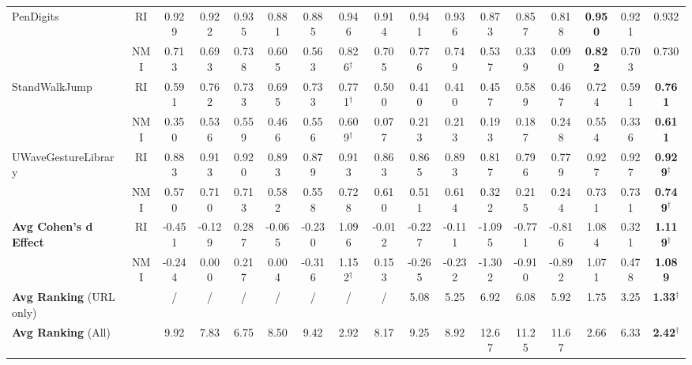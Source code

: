 \documentclass{article}
\begin{document}
\begin{table*}[h]
{\begin{tabular}{lcccccccc|cccccccc}
\multirow{2}{*}{PenDigits} & RI	& 0.929 & 0.922 &  	0.935 &	0.881 &	0.885  &	0.946 & 0.914 &	0.941 &	0.936 &	0.873 &	0.857 &	0.818 & \textbf{0.950} &	0.921  & 0.932       \\
                                           & NMI & 0.713	& 0.693 &  	0.738 &	0.605 &	0.563  &	0.826$^\dag$ & 0.705 &	0.776 & 0.749 &	0.537 &	0.339 &	0.090 & \textbf{0.822} & 0.703  & 0.730  \\
\multirow{2}{*}{StandWalkJump} & RI & 0.591	& 0.762 &  	0.733 &	0.695 &	0.733  &	0.771$^\dag$ & 0.500 &	0.410 &	0.410 &	0.457 &	0.589 &	0.467 & 0.724  &	0.591  & \textbf{0.761}    \\
                                           & NMI & 0.350	& 0.536 &  	0.559 &	0.466 &	0.556  &	0.609$^\dag$ & 0.077 &	0.213 &	0.213 &	0.193 &	0.187 &	0.248 &	0.554 & 0.336 & \textbf{0.611}   \\
\multirow{2}{*}{UWaveGestureLibrary} & RI & 0.883	& 0.913 &  	0.920 &	0.893 &	0.879  &	0.913 & 0.863 &	0.865 &	0.893 &	0.817 &	0.796 &	0.779 &	0.927 &	0.927    &  \textbf{0.929}$^\dag$  \\
                                           & NMI & 0.570	& 0.710 &  	0.713 &	0.582 &	0.558  &	0.728 &	0.610 & 0.511 &	0.614 & 0.322 &	0.215 &	0.244 &	0.731 &	0.731 & \textbf{0.749}$^\dag$   \\
\hline     
\multirow{2}{*}{\textbf{Avg Cohen's d Effect}}            & RI & -0.451 	& -0.129 & 	0.287 &  -0.065	& -0.230   &1.096 &-0.012	 &-0.227	 &-0.111	 &-1.095  &-0.771	 &-0.816  & 1.084 &  0.321 & \textbf{1.119}$^\dag$ \\
& NMI	& -0.244 & 0.000 & 	0.217	& 0.004	   & -0.316		& 1.152$^\dag$	& 0.153	& -0.265	& -0.232	& -1.302	&-0.910	& -0.892 & 1.071 & 0.478 & \textbf{1.089}   \\
                                           
\hline
\textbf{Avg Ranking } (URL only) & & / & / & / & / & / &
        / & / &  5.08 & 5.25 &  6.92 & 6.08    &  5.92
       & 1.75 & 3.25 & \textbf{1.33}$^\dag$    \\
\textbf{Avg Ranking } (All) & & 9.92 & 7.83 & 6.75 & 8.50 & 9.42 & 2.92 & 8.17 & 9.25 & 8.92 & 12.67 & 11.25 & 11.67  & 2.66 & 6.33 & \textbf{2.42}$^\dag$ \\
    \bottomrule
    \end{tabular}}
\end{table*}
\end{document}
